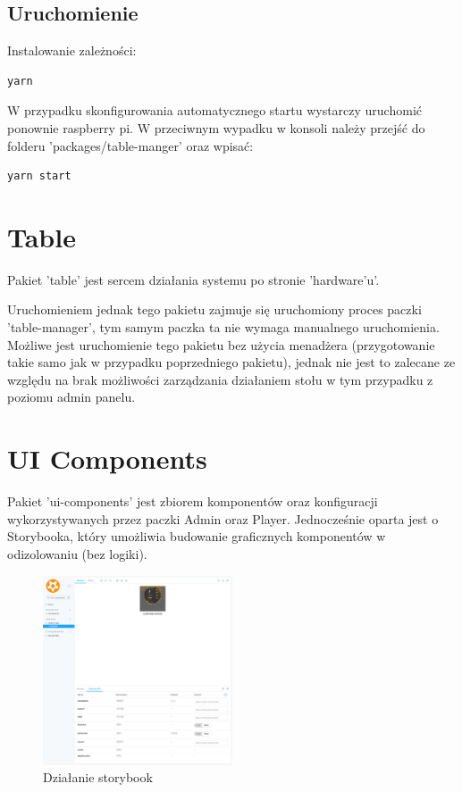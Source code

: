 \subsection{Uruchomienie}

Instalowanie zależności:

\begin{lstlisting}
yarn
\end{lstlisting}

W przypadku skonfigurowania automatycznego startu wystarczy uruchomić ponownie raspberry pi. W przeciwnym wypadku w konsoli należy przejść do folderu 'packages/table-manger' oraz wpisać:

\begin{lstlisting}
yarn start
\end{lstlisting}

\section{Table}
Pakiet 'table' jest sercem działania systemu po stronie 'hardware'u'.

Uruchomieniem jednak tego pakietu zajmuje się uruchomiony proces paczki 'table-manager', tym samym paczka ta nie wymaga manualnego uruchomienia. Możliwe jest uruchomienie tego pakietu bez użycia menadżera (przygotowanie takie samo jak w przypadku poprzedniego pakietu), jednak nie jest to zalecane ze względu na brak możliwości zarządzania działaniem stołu w tym przypadku z poziomu admin panelu.

\section{UI Components}
Pakiet 'ui-components' jest zbiorem komponentów oraz konfiguracji wykorzystywanych przez paczki Admin oraz Player. Jednocześnie oparta jest o Storybooka, który umożliwia budowanie graficznych komponentów w odizolowaniu (bez logiki).

\begin{figure}[h!]
  \centering
    \includegraphics[width=0.5\textwidth]{images/ui-components/storybook.png}
  \caption{Działanie storybook}
  \label{fig:mobile}
\end{figure}

